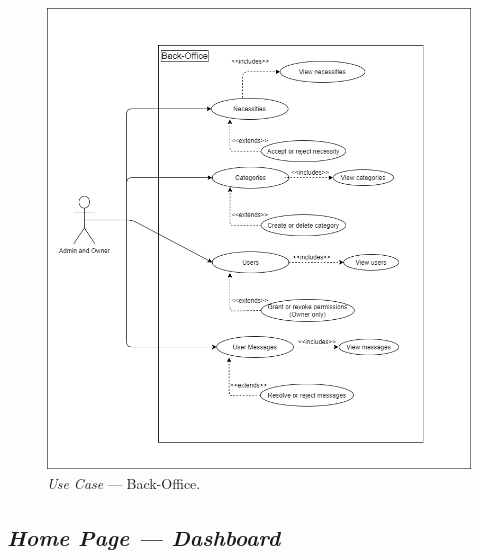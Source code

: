 \begin{figure}[H]
    \centering
    \includegraphics[scale=0.5]{figures/back-office_use_case (1).png}
    \caption{\textit{Use Case} --- Back-Office.}\label{fig:uc:backoffice_use_case}
\end{figure}

\newpage

\subsection{\textit{Home Page --- Dashboard}}\label{subsec:dashboard}

